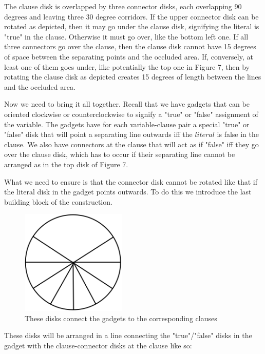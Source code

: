 \documentclass[a4paper,11pt]{article}
\begin{document}
The clause disk is overlapped by three connector disks, each overlapping 90 degrees and leaving three 30 degree corridors. If the upper connector disk can be rotated as depicted, then it may go under the clause disk, signifying the literal is "true" in the clause. Otherwise it must go over, like the bottom left one.
If all three connectors go over the clause, then the clause disk cannot have 15 degrees of space between the separating points and the occluded area. If, conversely, at least one of them goes under, like potentially the top one in Figure 7, then by rotating the clause disk as depicted creates 15 degrees of length between the lines and the occluded area.

Now we need to bring it all together. Recall that we have gadgets that can be oriented clockwise or counterclockwise to signify a "true" or "false" assignment of the variable. The gadgets have for each variable-clause pair a special "true" or "false" disk that will point a separating line outwards iff the $literal$ is false in the clause. We also have connectors at the clause that will act as if "false" iff they go over the clause disk, which has to occur if their separating line cannot be arranged as in the top disk of Figure 7.

What we need to ensure is that the connector disk cannot be rotated like that if the literal disk in the gadget points outwards. To do this we introduce the last building block of the construction.

\begin{figure}[h]
\centering
\includegraphics[width=5cm, height=5cm]{assets/np-hardness/literal_connector.png}
\caption{These disks connect the gadgets to the corresponding clauses}
\end{figure}

These disks will be arranged in a line connecting the "true"/"false" disks in the gadget with the clause-connector disks at the clause like so:
\end{document}
